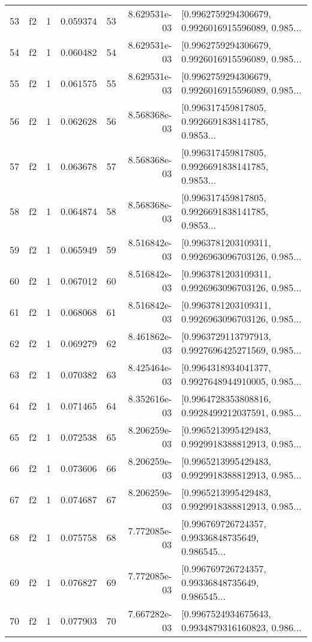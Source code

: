 \begin{tabular}{lllrlrl}
53  &  f2 &   1 &  0.059374 &   53 &  8.629531e-03 &  [0.9962759294306679, 0.9926016915596089, 0.985... \\
54  &  f2 &   1 &  0.060482 &   54 &  8.629531e-03 &  [0.9962759294306679, 0.9926016915596089, 0.985... \\
55  &  f2 &   1 &  0.061575 &   55 &  8.629531e-03 &  [0.9962759294306679, 0.9926016915596089, 0.985... \\
56  &  f2 &   1 &  0.062628 &   56 &  8.568368e-03 &  [0.996317459817805, 0.9926691838141785, 0.9853... \\
57  &  f2 &   1 &  0.063678 &   57 &  8.568368e-03 &  [0.996317459817805, 0.9926691838141785, 0.9853... \\
58  &  f2 &   1 &  0.064874 &   58 &  8.568368e-03 &  [0.996317459817805, 0.9926691838141785, 0.9853... \\
59  &  f2 &   1 &  0.065949 &   59 &  8.516842e-03 &  [0.9963781203109311, 0.9926963096703126, 0.985... \\
60  &  f2 &   1 &  0.067012 &   60 &  8.516842e-03 &  [0.9963781203109311, 0.9926963096703126, 0.985... \\
61  &  f2 &   1 &  0.068068 &   61 &  8.516842e-03 &  [0.9963781203109311, 0.9926963096703126, 0.985... \\
62  &  f2 &   1 &  0.069279 &   62 &  8.461862e-03 &  [0.9963729113797913, 0.9927696425271569, 0.985... \\
63  &  f2 &   1 &  0.070382 &   63 &  8.425464e-03 &  [0.9964318934041377, 0.9927648944910005, 0.985... \\
64  &  f2 &   1 &  0.071465 &   64 &  8.352616e-03 &  [0.9964728353808816, 0.9928499212037591, 0.985... \\
65  &  f2 &   1 &  0.072538 &   65 &  8.206259e-03 &  [0.9965213995429483, 0.9929918388812913, 0.985... \\
66  &  f2 &   1 &  0.073606 &   66 &  8.206259e-03 &  [0.9965213995429483, 0.9929918388812913, 0.985... \\
67  &  f2 &   1 &  0.074687 &   67 &  8.206259e-03 &  [0.9965213995429483, 0.9929918388812913, 0.985... \\
68  &  f2 &   1 &  0.075758 &   68 &  7.772085e-03 &  [0.996769726724357, 0.99336848735649, 0.986545... \\
69  &  f2 &   1 &  0.076827 &   69 &  7.772085e-03 &  [0.996769726724357, 0.99336848735649, 0.986545... \\
70  &  f2 &   1 &  0.077903 &   70 &  7.667282e-03 &  [0.9967524934675643, 0.9934879316160823, 0.986... \\

\end{tabular}
